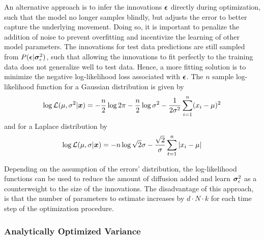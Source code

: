         An alternative approach is to infer the innovations $\bm{\epsilon}$ directly during optimization, such that the model no longer samples blindly, but adjusts the error to better capture the underlying movement. 
        Doing so, it is important to penalize the addition of noise to prevent overfitting and incentivize the learning of other model parameters. The innovations for test data predictions are still sampled from $P(\bm{\epsilon}|\bm{\sigma}_\epsilon^2)$, such that allowing the innovations to fit perfectly to the training data does not generalize well to test data. Hence, a more fitting solution is to minimize the negative log-likelihood loss associated with $\bm{\epsilon}$. The $n$ sample log-likelihood function for a Gaussian distribution is given by
        \begin{equation}\label{error-gaussian-log-loss}
            \log\mathcal{L}(\mu, \sigma^2\vert \bm{x}) = -\frac{n}{2}\log2\pi - \frac{n}{2}\log\sigma^2 - \frac{1}{2\sigma^2}\sum_{i=1}^n (x_i - \mu)^2
        \end{equation}
        and for a Laplace distribution by
        \begin{equation}\label{error-laplace-log-loss}
            \log\mathcal{L}(\mu,\sigma\vert \bm{x}) = -n\log\sqrt{2}\sigma -\frac{\sqrt{2}} {\sigma} \sum_{t=1}^n |x_i-\mu|
        \end{equation}
    
        Depending on the assumption of the errors' distribution, the log-likelihood functions can be used to reduce the amount of diffusion added and learn $\bm{\sigma}_\epsilon^2$ as a counterweight to the size of the innovations. The disadvantage of this approach, is that the number of parameters to estimate increases by $d\cdot N\cdot k$ for each time step of the optimization procedure.
        
    \subsubsection{Analytically Optimized Variance}
        
